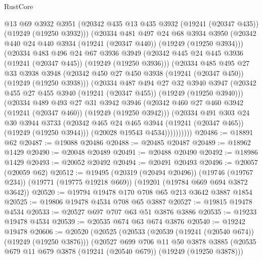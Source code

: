 \begin{lexlean}{RustCore}
\begin{coremodule}
          @13
          @69
          @3932
          @3951
          (@20342 @435 @13 @435 @3932 (@19241 (@20347 @435)) (@19249 (@19250 @3932)))
          (@20334
            @481
            @497
            @24
            @68
            @3934
            @3950
            (@20342 @440 @24 @440 @3934 (@19241 (@20347 @440)) (@19249 (@19250 @3934)))
            (@20334
              @483
              @496
              @24
              @67
              @3936
              @3949
              (@20342 @445 @24 @445 @3936 (@19241 (@20347 @445)) (@19249 (@19250 @3936)))
              (@20334
                @485
                @495
                @27
                @33
                @3938
                @3948
                (@20342 @450 @27 @450 @3938 (@19241 (@20347 @450)) (@19249 (@19250 @3938)))
                (@20334
                  @487
                  @494
                  @27
                  @32
                  @3940
                  @3947
                  (@20342 @455 @27 @455 @3940 (@19241 (@20347 @455)) (@19249 (@19250 @3940)))
                  (@20334
                    @489
                    @493
                    @27
                    @31
                    @3942
                    @3946
                    (@20342 @460 @27 @460 @3942 (@19241 (@20347 @460)) (@19249 (@19250 @3942)))
                    (@20334
                      @491
                      @303
                      @24
                      @30
                      @3944
                      @3733
                      (@20342 @465 @24 @465 @3944 (@19241 (@20347 @465)) (@19249 (@19250 @3944)))
                      (@20028 @19543 @4534))))))))))
@20486 := @18891 @62
@20487 := @19088 @20486
@20488 := @20485 @20487
@20489 := @18962 @1429
@20490 := @20048 @20489
@20491 := @20488 @20490
@20492 := @18986 @1429
@20493 := @20052 @20492
@20494 := @20491 @20493
@20496 := @20057 (@20059 @62)
@20512 := @19495
    (@20319 (@20494 @20496))
    (@19746 (@19767 @234))
    (@19771 (@19775 @19218 @669))
    (@19201 (@19784 @669 @694 @3872 @3642))
@20520 := @19794 @19478 @170 @708 @65 @213 @3642 @3887 @1854
@20525 := @19806 @19478 @4534 @708 @65 @3887
@20527 := @19815 @19478 @4534
@20533 := @20527 @697 @707 @63 @51 @3876 @3886
@20535 := @19233 @19478 @4534
@20539 := @20535 @674 @63 @674 @3876
@20540 := @19242 @19478
@20606 := @20520
    (@20525
      (@20533
        (@20539 (@19241 (@20540 @674)) (@19249 (@19250 @3876)))
        (@20527
          @699
          @706
          @11
          @50
          @3878
          @3885
          (@20535 @679 @11 @679 @3878 (@19241 (@20540 @679)) (@19249 (@19250 @3878)))

\end{coremodule}
\end{lexlean}
